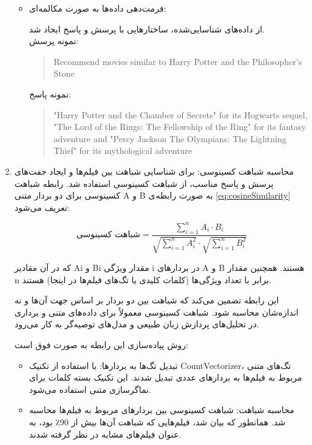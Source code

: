\begin{enumerate}
\begin{itemize}
\item
فرمت‌دهی داده‌ها به صورت مکالمه‌ای:

از داده‌های شناسایی‌شده، ساختارهایی با پرسش و پاسخ ایجاد شد.\\
نمونه پرسش:
\begin{quote}
\begin{LTR}
Recommend movies similar to Harry Potter and the Philosopher's Stone
\end{LTR}
\end{quote}
نمونه پاسخ:
\begin{quote}
\begin{LTR}
"Harry Potter and the Chamber of Secrets" for its Hogwarts sequel, "The Lord of the Rings: The Fellowship of the Ring" for its fantasy adventure and "Percy Jackson The Olympians: The Lightning Thief" for its mythological adventure
\end{LTR}
\end{quote}
\end{itemize}

\item
محاسبه شباهت کسینوسی:
برای شناسایی شباهت بین فیلم‌ها و ایجاد جفت‌های پرسش و پاسخ مناسب، از شباهت کسینوسی استفاده شد. رابطه شباهت کسینوسی برای دو بردار متنی A و B به صورت رابطه ی %
\ref{eq:cosineSimilarity}
 تعریف می‌شود:

 
\begin{equation}
\label{eq:cosineSimilarity}
\text{شباهت کسینوسی} = \frac{\sum_{i=1}^{n} A_i \cdot B_i}{\sqrt{\sum_{i=1}^{n} A_i^2} \cdot \sqrt{\sum_{i=1}^{n} B_i^2}}
\end{equation}


که در آن مقادیر Ai​ و Bi​ مقدار ویژگی i در بردارهای A و B هستند. همچنین مقدار n برابر با تعداد ویژگی‌ها (کلمات کلیدی یا تگ‌های فیلم‌ها در اینجا) هستند.

این رابطه تضمین می‌کند که شباهت بین دو بردار بر اساس جهت آن‌ها و نه اندازه‌شان محاسبه شود. شباهت کسینوسی معمولاً برای داده‌های متنی و برداری در تحلیل‌های پردازش زبان طبیعی و مدل‌های توصیه‌گر به کار می‌رود.

روش پیاده‌سازی این رابطه به صورت فوق است:
\begin{itemize}
\item
تبدیل تگ‌ها به بردارها: با استفاده از تکنیک CountVectorizer، تگ‌های متنی مربوط به فیلم‌ها به بردارهای عددی تبدیل شدند. این تکنیک بسته کلمات%
 برای نماگر‌سازی متنی استفاده می‌شود.
\item
محاسبه شباهت: شباهت کسینوسی بین بردارهای مربوط به فیلم‌ها محاسبه شد. همانطور که بیان شد، فیلم‌هایی که شباهت آن‌ها بیش از 90٪ بود، به عنوان فیلم‌های مشابه در نظر گرفته شدند.
\end{itemize}


\end{enumerate}
